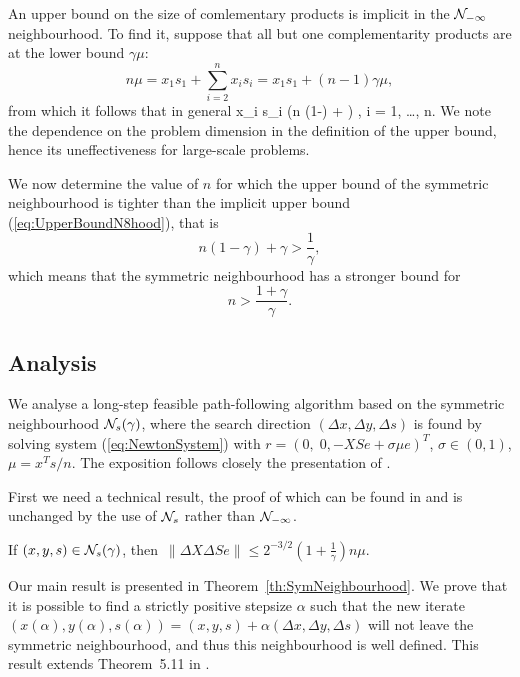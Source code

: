An upper bound on the size of comlementary products
is implicit in the $\mathcal{N}_{-\infty}$ neighbourhood. To find it,
suppose that all but one complementarity products are at the lower bound
$\gamma\mu$:
\[
  n\mu = x_1s_1 + \sum_{i=2}^n x_is_i = x_1 s_1 + (n-1)\gamma\mu,
\]
from which it follows that in general
\be  \label{eq:UpperBoundN8hood}
  x_i s_i \le (n (1-\gamma) + \gamma) \mu, \quad i = 1, \ldots, n.
\ee
We note the dependence on the problem dimension in the definition of the
upper bound, hence its uneffectiveness for large-scale problems.

We now determine the value of $n$ for which the upper bound of
the symmetric neighbourhood is tighter than the implicit upper bound
(\ref{eq:UpperBoundN8hood}), that is
\[
  n(1-\gamma) + \gamma > \frac{1}{\gamma},
\]
which means that the symmetric neighbourhood has a stronger bound
for
\[
  n > \frac{1+\gamma}{\gamma}.
\]

%
%
\subsection{Analysis}

We analyse a long-step feasible path-following 
algorithm based on the symmetric neighbourhood $\mathcal{N}_s(\gamma)$, 
where the search direction $(\Delta x, \Delta y, \Delta s)$ 
is found by solving system (\ref{eq:NewtonSystem}) with 
$r=(0,\; 0,-XSe+\sigma\mu e)^T$, $\sigma\in(0,1)$, $\mu=x^Ts/n$.
%
The exposition follows closely the presentation of 
\cite[Chapter~5]{ipm:Wright97}. 

First we need a technical result, the proof of which can be found 
in \cite[Lemma~5.10]{ipm:Wright97} and is unchanged by the use 
of $\mathcal{N}_s$ rather than $\mathcal{N}_{-\infty}$.
%
\begin{lemma} \label{Wright:5.10}
If $(x,y,s)\in \mathcal{N}_s(\gamma)$, then\,
\(
  \|\Delta X\Delta Se\| \le 2^{-3/2}\left( 1+ \displaystyle{\frac{1}{\gamma}} \right)n\mu.
\)
\end{lemma}

Our main result is presented in Theorem~\ref{th:SymNeighbourhood}. 
We prove that it is possible to find a strictly positive stepsize 
$\alpha$ such that the new iterate 
$(x(\alpha),y(\alpha),s(\alpha))=(x,y,s)+\alpha(\Delta x,\Delta y,\Delta s)$
will not leave the symmetric neighbourhood, and thus this 
neighbourhood is well defined. This result extends 
Theorem~5.11 in \cite{ipm:Wright97}.

